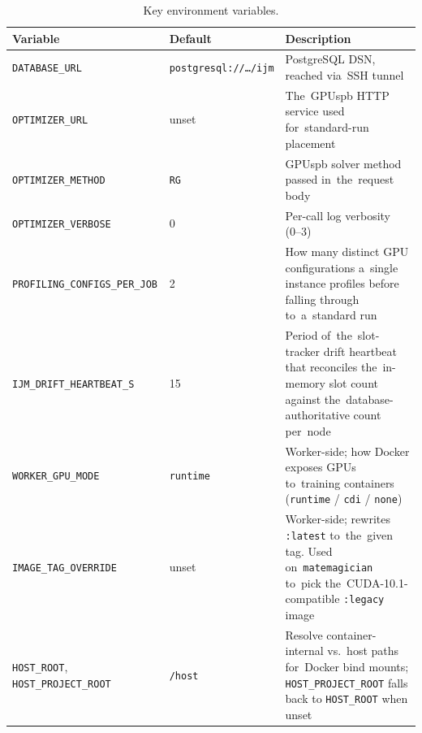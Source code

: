 \begin{table}[H]
\centering
\begin{tabularx}{\textwidth}{@{}l l X@{}}
\toprule
\textbf{Variable} & \textbf{Default} & \textbf{Description} \\
\midrule
\texttt{DATABASE\_URL}                  & \texttt{postgresql://\ldots/ijm} & PostgreSQL DSN, reached via~SSH tunnel \\
\texttt{OPTIMIZER\_URL}                 & unset & The~GPUspb HTTP service used for~standard-run placement \\
\texttt{OPTIMIZER\_METHOD}              & \texttt{RG} & GPUspb solver method passed in~the~request body \\
\texttt{OPTIMIZER\_VERBOSE}             & 0 & Per-call log verbosity (0--3) \\
\texttt{PROFILING\_CONFIGS\_PER\_JOB}   & 2 & How many distinct GPU configurations a~single instance profiles before falling through to~a~standard run \\
\texttt{IJM\_DRIFT\_HEARTBEAT\_S}       & 15 & Period of~the~slot-tracker drift heartbeat that reconciles the~in-memory slot count against the~database-authoritative count per~node \\
\texttt{WORKER\_GPU\_MODE}              & \texttt{runtime} & Worker-side; how Docker exposes GPUs to~training containers (\texttt{runtime} / \texttt{cdi} / \texttt{none}) \\
\texttt{IMAGE\_TAG\_OVERRIDE}           & unset & Worker-side; rewrites \texttt{:latest} to~the~given tag.  Used on~\texttt{matemagician} to~pick the~CUDA-10.1-compatible \texttt{:legacy} image \\
\texttt{HOST\_ROOT}, \texttt{HOST\_PROJECT\_ROOT} & \texttt{/host} & Resolve container-internal vs.~host paths for~Docker bind mounts; \texttt{HOST\_PROJECT\_ROOT} falls back to \texttt{HOST\_ROOT} when unset \\
\bottomrule
\end{tabularx}
\caption{Key environment variables.}\label{tab:env-vars}
\end{table}
